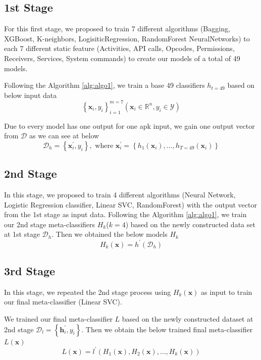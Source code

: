 \subsection{1st Stage}
For this first stage, we proposed to train 7 different algorithms (Bagging, XGBoost, K-neighbors, LogisiticRegression, RandomForest NeuralNetworks) to each 7 different static feature (Activities, API calls, Opcodes, Permissions, Receivers, Services, System commands) to create our models of a total of 49 models. 

Following the Algorithm \ref{alg:algo1}, we train a base 49 classifiers $h_{t=49}$ based on below input data $$\left\{\mathbf{x}_{i}, y_{i}\right\}_{i=1}^{m=7}\left(\mathbf{x}_{i} \in \mathbb{R}^{n}, y_{i} \in \mathcal{Y}\right)$$


Due to every model has one output for one \ac{apk} input, we gain one output vector from $\mathcal{D}$ as we can see at below $$\mathcal{D}_h = \left\{\mathbf{x}_{i}^{\prime}, y_{i}\right\}, \text { where } \mathbf{x}_{i}^{\prime}=\left\{h_{1}\left(\mathbf{x}_{i}\right), \ldots, h_{T=49}\left(\mathbf{x}_{i}\right)\right\}$$

\subsection{2nd Stage}
In this stage, we proposed to train 4 different algorithms (Neural Network, Logistic Regression classifier, Linear SVC, RandomForest) with the output vector from the 1st stage as input data.
Following the Algorithm \ref{alg:algo1}, we train our 2nd stage meta-classifiers $H_{k}$($k=4$) based on the newly constructed data set at 1st stage $\mathcal{D}_h$. Then we obtained the below models $H_{k}$
$$H_{k}(\mathbf{x})=h^{\prime}\left(\mathcal{D}_h\right)$$



\subsection{3rd Stage}
In this stage, we repeated the 2nd stage process using $H_{k}\left(\mathbf{x}\right)$ as input to train our final meta-classifier (Linear SVC).

We trained our final meta-classifier $L$ based on the newly constructed dataset at 2nd stage $\mathcal{D}_l = \left\{\mathbf{h}_{i}^{\prime}, y_{i}\right\}$. Then we obtain the below trained final meta-classifier $L\left(\mathbf{x}\right)$
$$L(\mathbf{x})=l^{\prime}\left(H_{1}(\mathbf{x}), H_{2}(\mathbf{x}), \ldots, H_{k}(\mathbf{x})\right)$$



